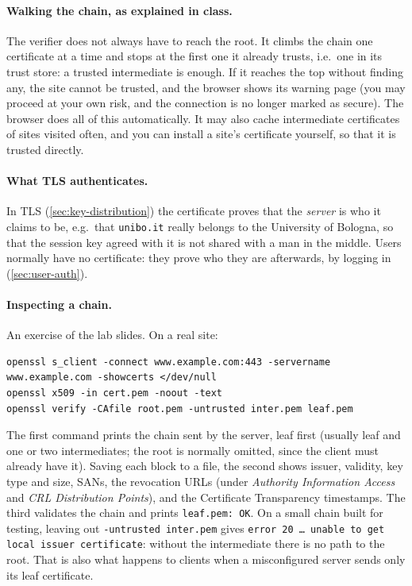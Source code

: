 \paragraph{Walking the chain, as explained in class.} The verifier does not always have to reach the root. It climbs the chain one certificate at a time and stops at the first one it already trusts, i.e.\ one in its trust store: a trusted intermediate is enough. If it reaches the top without finding any, the site cannot be trusted, and the browser shows its warning page (you may proceed at your own risk, and the connection is no longer marked as secure). The browser does all of this automatically. It may also cache intermediate certificates of sites visited often, and you can install a site's certificate yourself, so that it is trusted directly.

\paragraph{What TLS authenticates.} In TLS (\cref{sec:key-distribution}) the certificate proves that the \emph{server} is who it claims to be, e.g.\ that \texttt{unibo.it} really belongs to the University of Bologna, so that the session key agreed with it is not shared with a man in the middle. Users normally have no certificate: they prove who they are afterwards, by logging in (\cref{sec:user-auth}).

\paragraph{Inspecting a chain.} An exercise of the lab slides. On a real site:
\begin{verbatim}
openssl s_client -connect www.example.com:443 -servername www.example.com -showcerts </dev/null
openssl x509 -in cert.pem -noout -text
openssl verify -CAfile root.pem -untrusted inter.pem leaf.pem
\end{verbatim}
The first command prints the chain sent by the server, leaf first (usually leaf and one or two intermediates; the root is normally omitted, since the client must already have it). Saving each block to a file, the second shows issuer, validity, key type and size, SANs, the revocation URLs (under \emph{Authority Information Access} and \emph{CRL Distribution Points}), and the Certificate Transparency timestamps. The third validates the chain and prints \texttt{leaf.pem: OK}. On a small chain built for testing, leaving out \texttt{-untrusted inter.pem} gives \texttt{error 20 \dots{} unable to get local issuer certificate}: without the intermediate there is no path to the root. That is also what happens to clients when a misconfigured server sends only its leaf certificate.

